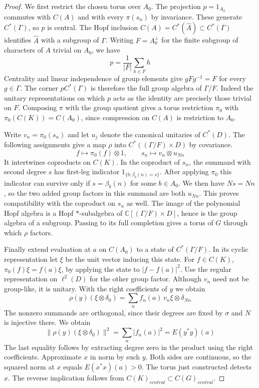 \documentclass[11pt,a4paper]{article}
\theoremstyle{remark}
\begin{document}
\begin{proof}
We first restrict the chosen torus over $A_0$. The projection
$p=1_{A_0}$ commutes with $C(A)$ and with every $\pi(s_n)$ by
invariance. These generate $C^*(\Gamma)$, so $p$ is central.
The Hopf inclusion $C(A)=C^*(\widehat A)\subset C^*(\Gamma)$ identifies
$\widehat A$ with a subgroup of $\Gamma$. Writing $F=A_0^\perp$ for the
finite subgroup of characters of $A$ trivial on $A_0$, we have
\[
 p=\frac1{|F|}\sum_{h\in F}h
\]
Centrality and linear independence of group elements give
$gFg^{-1}=F$ for every $g\in\Gamma$. The corner $pC^*(\Gamma)$ is
therefore the full group algebra of $\Gamma/F$. Indeed the unitary
representations on which $p$ acts as the identity are precisely those
trivial on $F$. Composing $\pi$ with the group quotient gives a torus
restriction $\pi_0$ with $\pi_0(C(K))=C(A_0)$, since compression on
$C(A)$ is restriction to $A_0$.

Write $v_n=\pi_0(s_n)$ and let $u_j$ denote the canonical unitaries of
$C^*(D)$. The following assignments give a map $\rho$ into
$C^*((\Gamma/F)\times D)$ by covariance.
\[
 f\longmapsto\pi_0(f)\otimes1,\qquad
 s_n\longmapsto v_n\otimes u_{Nn}
\]
It intertwines coproducts on $C(K)$. In the coproduct of $s_n$, the
summand with second degree $s$ has first-leg indicator
$1_{\{b:\beta_b(n)=s\}}$. After applying $\pi_0$ this indicator can
survive only if $s=\beta_b(n)$ for some $b\in A_0$. We then have
$Ns=Nn$, so the two added group factors in this summand are both
$u_{Nn}$. This proves compatibility with the coproduct on $s_n$ as well.
The image of the polynomial Hopf algebra is a Hopf $*$-subalgebra of
$\mathbb C[(\Gamma/F)\times D]$, hence is the group algebra of a
subgroup. Passing to its full completion gives a torus of $G$ through
which $\rho$ factors.

Finally extend evaluation at $a$ on $C(A_0)$ to a state of
$C^*(\Gamma/F)$. In its cyclic representation let $\xi$ be the unit
vector inducing this state. For $f\in C(K)$,
$\pi_0(f)\xi=f(a)\xi$, by applying the state to $|f-f(a)|^2$.
Use the regular representation on $\ell^2(D)$ for the other group
factor. Although $v_n$ need not be group-like, it is unitary. With the
right coefficients of $y$ we obtain
\[
 \rho(y)(\xi\otimes\delta_0)
       =\sum_n f_n(a)\,v_n\xi\otimes\delta_{Nn}
\]
The nonzero summands are orthogonal, since their degrees are fixed
by $\sigma$ and $N$ is injective there. We obtain
\[
 \|\rho(y)(\xi\otimes\delta_0)\|^2
       =\sum_n |f_n(a)|^2=E(y^*y)(a)
\]
The last equality follows by extracting degree zero in the product
using the right coefficients. Approximate $x$ in norm by such $y$.
Both sides are continuous, so the squared norm at $x$ equals
$E(x^*x)(a)>0$. The torus just constructed detects $x$. The reverse
implication follows from $C(K)_{central}\subset C(G)_{central}$.
\end{proof}
\end{document}
